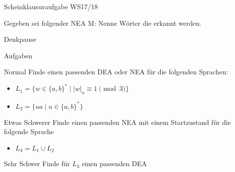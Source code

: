{
\begin{frame}{Scheinklausuraufgabe WS17/18}
\begin{alertblock} {Gegeben sei folgender NEA M:}
Nenne Wörter die erkannt werden.\\
\end{alertblock}
\end{frame}
}

{
\begin{frame}{Denkpause}
\footnotesize
    \begin{alertblock}{Aufgaben}
    \end{alertblock}
    \begin{block}{Normal}
    Finde einen passenden DEA oder NEA für die folgenden Sprachen:
    \begin{itemize}
        \item $L_1 = \{w \in \{a,b\}^* \mid |w|_a \equiv 1 \pmod{3}\}$
        \item $L_2 = \{ua\mid u \in \{a,b\}^*\}$
    \end{itemize}
    \end{block}
    \begin{block}{Etwas Schwerer}
    Finde einen passenden NEA mit \alert{einem Startzustand} für die folgende Sprache
    \begin{itemize}
        \item $L_3 = L_1 \cup L_2$
    \end{itemize}
    \end{block}
    \begin{block}{Sehr Schwer}
        Finde für $L_3$ einen passenden DEA
    \end{block}
\end{frame}
}

